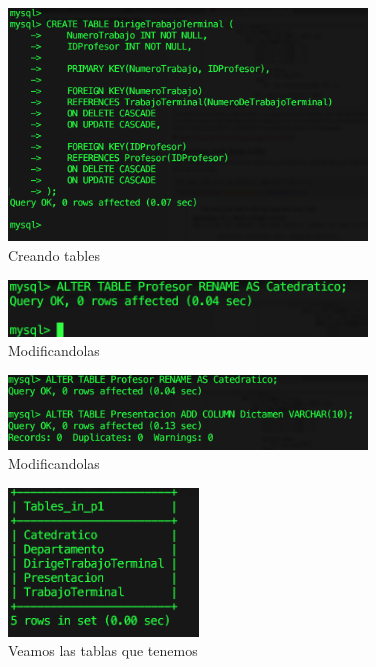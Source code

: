 \documentclass[12pt, fleqn]{article}                             %
\begin{document}
        \begin{figure}[h]
            \centering
            \includegraphics[width=0.85\textwidth]{BD1Reporte4}
            \caption{Creando tables}
        \end{figure}

        \begin{figure}[h]
            \centering
            \includegraphics[width=0.85\textwidth]{BD1Reporte5}
            \caption{Modificandolas}
        \end{figure}

        \begin{figure}[h]
            \centering
            \includegraphics[width=0.85\textwidth]{BD1Reporte6}
            \caption{Modificandolas}
        \end{figure}

        \begin{figure}[h]
            \centering
            \includegraphics[width=0.45\textwidth]{BD1Reporte7}
            \caption{Veamos las tablas que tenemos}
        \end{figure}
\end{document}
